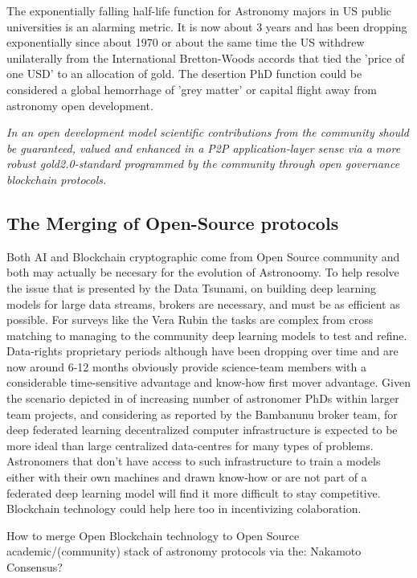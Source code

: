 \documentclass[final,5p,times,twocolumn,authoryear]{elsarticle}
\begin{document}
The exponentially falling half-life function for Astronomy majors in US public universities is an alarming metric. It is now about 3 years and has been dropping exponentially since about 1970 or about the same time the US withdrew unilaterally from the International Bretton-Woods accords that tied the 'price of one USD' to an allocation of gold. The desertion PhD function could be considered a global hemorrhage of 'grey matter' or capital flight away from astronomy open development.

\emph{In an open development model scientific contributions from the community should be guaranteed, valued and enhanced in a P2P application-layer sense via a more robust gold2.0-standard programmed by the community through open governance blockchain protocols.}


\subsection{The Merging of Open-Source protocols}

Both AI and Blockchain cryptographic come from Open Source community and both may actually be necesary for the evolution of Astronoomy. To help resolve the issue that is presented by the Data Tsunami, on building deep learning models for large data streams, brokers are necessary, and must be as efficient as possible. For surveys like the Vera Rubin the tasks are complex from cross matching to managing to the community deep learning models to test and refine. Data-rights proprietary periods although have been dropping over time and are now around 6-12 months obviously provide science-team members with a considerable time-sensitive advantage and know-how first mover advantage.  Given the scenario depicted in \label{btc2:sec:sub:half} of increasing number of astronomer PhDs within larger team projects, and considering as reported by the Bambanunu broker team, for deep federated learning decentralized computer infrastructure is expected to be more ideal than large centralized data-centres for many types of problems.  Astronomers that don't have access to such infrastructure to train a models either with their own machines and drawn know-how or are not part of a federated deep learning model will find it more difficult to stay competitive. Blockchain technology could help here too in incentivizing colaboration.   

How to merge Open Blockchain technology to Open Source academic/(community) stack of astronomy protocols via the: Nakamoto Consensus?
\end{document}
